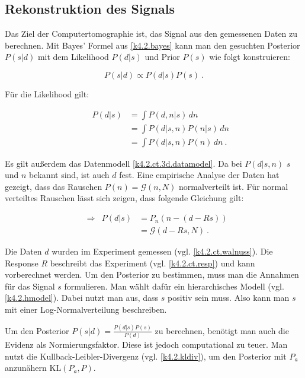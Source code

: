 \subsection{Rekonstruktion des Signals}

Das Ziel der Computertomographie ist, das Signal aus den gemessenen Daten zu berechnen. Mit Bayes' Formel aus \cref{k4.2.bayes} kann man den gesuchten Posterior $P(s|d)$ mit dem Likelihood $P(d|s)$ und Prior $P(s)$ wie folgt konstruieren:

\begin{equation}
  P(s|d) \propto P(d|s)P(s)\ .
\end{equation}

Für die Likelihood gilt:

\begin{equation}
  \begin{aligned}
    && P(d|s) &= \int P(d,n|s) \,dn  \\
    &&  &= \int P(d|s,n) P(n|s) \,dn \\
    && &= \int P(d|s,n) P(n) \,dn \ .
  \end{aligned}
\end{equation}

Es gilt außerdem das Datenmodell \cref{k4.2.ct.3d.datamodel}. Da bei $P(d|s,n)$ $s$ und $n$ bekannt sind, ist auch $d$ fest. Eine empirische Analyse der Daten hat gezeigt, dass das Rauschen $P(n) = \mathcal{G}(n,N)$ normalverteilt ist. Für normal verteiltes Rauschen lässt sich zeigen, dass folgende Gleichung gilt:

\begin{equation}
  \begin{aligned}
    &\Rightarrow& P(d|s) &= P_n(n-(d-Rs)) \\ 
    && &= \mathcal{G}(d-Rs,N) \ .
  \end{aligned}
\end{equation}

Die Daten $d$ wurden im Experiment gemessen (vgl. \cref{k4.2.ct.walnuss}). Die Response $R$ beschreibt das Experiment (vgl. \cref{k4.2.ct.resp}) und kann vorberechnet werden. Um den Posterior zu bestimmen, muss man die Annahmen für das Signal $s$ formulieren. Man wählt dafür ein hierarchisches Modell (vgl. \cref{k4.2.hmodel}). Dabei nutzt man aus, dass $s$ positiv sein muss. Also kann man $s$ mit einer Log-Normalverteilung beschreiben. 

Um den Posterior $P(s|d) = \frac{P(d|s)P(s)}{P(d)}$ zu berechnen, benötigt man auch die Evidenz als Normierungsfaktor. Diese ist jedoch computational zu teuer. Man nutzt die Kullback-Leibler-Divergenz (vgl. \cref{k4.2.kldiv}), um den Posterior mit $P_a$ anzunähern $\mathrm{KL}(P_a,P)$. 


